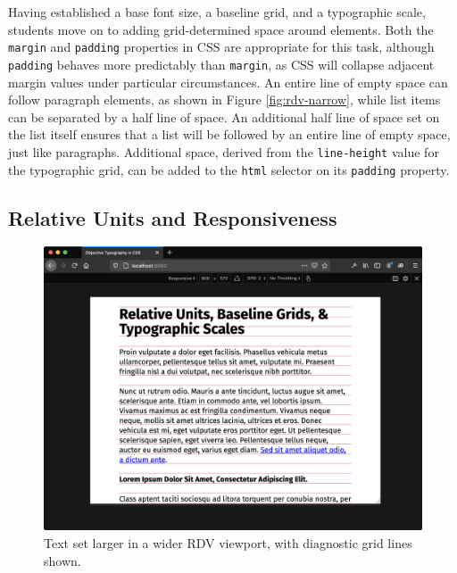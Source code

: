 \documentclass[sigconf,sigplan,review,anonymous]{acmart}
\begin{document}
Having established a base font size, a baseline grid, and a typographic scale, students move on to adding grid-determined space around elements. Both the \verb|margin| and \verb|padding| properties in CSS are appropriate for this task, although \verb|padding| behaves more predictably than \verb|margin|, as CSS will collapse adjacent margin values under particular circumstances.
An entire line of empty space can follow paragraph elements, as shown in Figure \ref{fig:rdv-narrow}, while list items can be separated by a half line of space. An additional half line of space set on the list itself ensures that a list will be followed by an entire line of empty space, just like paragraphs.
Additional space, derived from the \verb|line-height| value for the typographic grid, can be added to the \verb|html| selector on its \verb|padding| property.

\subsection{Relative Units and Responsiveness}

\begin{figure}
  \includegraphics[width=\linewidth]{rdv-wide}
  \caption{Text set larger in a wider RDV viewport, with diagnostic grid lines shown.}
  \label{fig:rdv-wide}
\end{figure}
\end{document}
